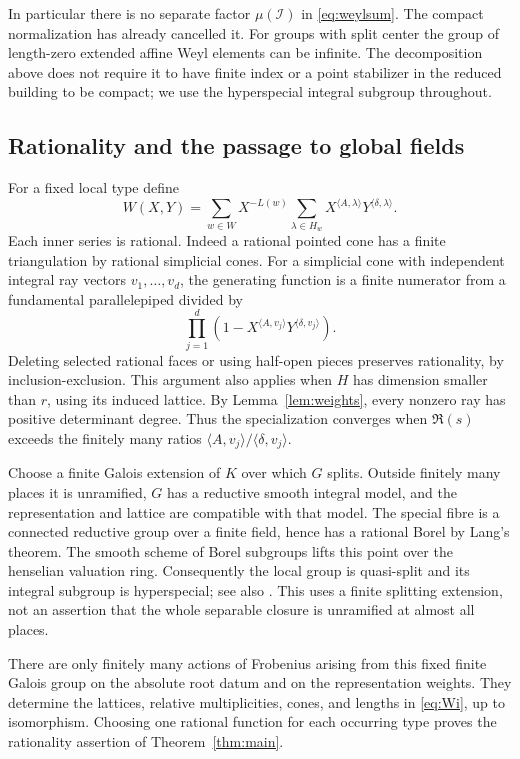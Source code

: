 \documentclass[11pt,a4paper]{article}
\theoremstyle{definition}
\begin{document}
In particular there is no separate factor $\mu(\mathcal I)$ in
\eqref{eq:weylsum}. The compact normalization has already cancelled it.
For groups with split center the group of length-zero extended affine
Weyl elements can be infinite. The decomposition above does not require
it to have finite index or a point stabilizer in the reduced building
to be compact; we use the hyperspecial integral subgroup throughout.

\subsection{Rationality and the passage to global fields}
For a fixed local type define
\begin{equation}\label{eq:Wi}
 W(X,Y)=\sum_{w\in W}X^{-L(w)}
     \sum_{\lambda\in H_w}
        X^{\langle A,\lambda\rangle}Y^{\langle\delta,\lambda\rangle}.
\end{equation}
Each inner series is rational. Indeed a rational pointed cone has a
finite triangulation by rational simplicial cones. For a simplicial cone
with independent integral ray vectors $v_1,\ldots,v_d$, the generating
function is a finite numerator from a fundamental parallelepiped divided
by
\[
 \prod_{j=1}^d
    (1-X^{\langle A,v_j\rangle}Y^{\langle\delta,v_j\rangle}).
\]
Deleting selected rational faces or using half-open pieces preserves
rationality, by inclusion-exclusion. This argument also applies when
$H$ has dimension smaller than $r$, using its induced lattice.
By Lemma~\ref{lem:weights}, every nonzero ray has positive determinant
degree. Thus the specialization converges when $\Re(s)$ exceeds the
finitely many ratios $\langle A,v_j\rangle/\langle\delta,v_j\rangle$.

Choose a finite Galois extension of $K$ over which $G$ splits. Outside
finitely many places it is unramified, $G$ has a reductive smooth
integral model, and the representation and lattice are compatible with
that model. The special fibre is a connected reductive group over a
finite field, hence has a rational Borel by Lang's theorem. The smooth
scheme of Borel subgroups lifts this point over the henselian valuation
ring. Consequently the local group is quasi-split and its integral
subgroup is hyperspecial; see also \cite[\S3.9]{Tits}.
This uses a finite splitting extension, not an assertion that the whole
separable closure is unramified at almost all places.

There are only finitely many actions of Frobenius arising from this fixed
finite Galois group on the absolute root datum and on the representation
weights. They determine the lattices, relative multiplicities, cones,
and lengths in \eqref{eq:Wi}, up to isomorphism. Choosing one rational
function for each occurring type proves the rationality assertion of
Theorem~\ref{thm:main}.
\end{document}
